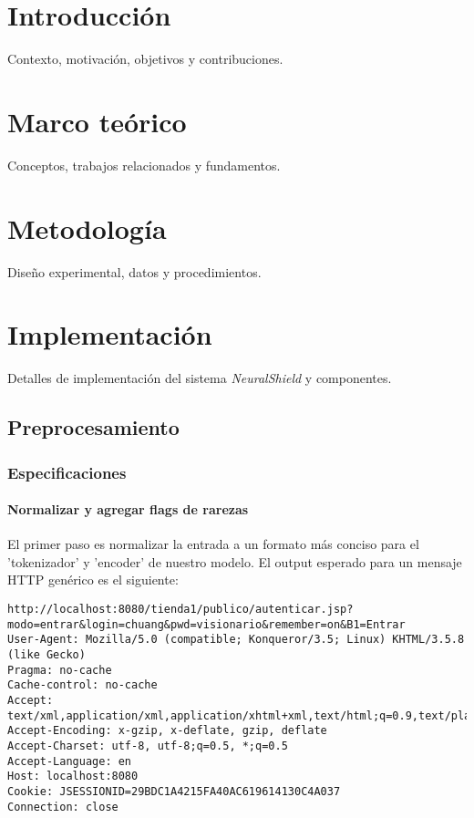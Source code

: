 \documentclass[12pt,oneside,a4paper]{report}
\begin{document}
\chapter{Introducción}
Contexto, motivación, objetivos y contribuciones.

\chapter{Marco teórico}
Conceptos, trabajos relacionados y fundamentos.

\chapter{Metodología}
Diseño experimental, datos y procedimientos.

\chapter{Implementación}
Detalles de implementación del sistema \emph{NeuralShield} y componentes.

\section{Preprocesamiento}
\subsection{Especificaciones}

\subsubsection{Normalizar y agregar flags de rarezas}
El primer paso es normalizar la entrada a un formato más conciso para el 'tokenizador' y 'encoder' de nuestro modelo. El output esperado para un mensaje HTTP genérico es el siguiente:
\begin{verbatim}
http://localhost:8080/tienda1/publico/autenticar.jsp?modo=entrar&login=chuang&pwd=visionario&remember=on&B1=Entrar
User-Agent: Mozilla/5.0 (compatible; Konqueror/3.5; Linux) KHTML/3.5.8 (like Gecko)
Pragma: no-cache
Cache-control: no-cache
Accept: text/xml,application/xml,application/xhtml+xml,text/html;q=0.9,text/plain;q=0.8,image/png,*/*;q=0.5
Accept-Encoding: x-gzip, x-deflate, gzip, deflate
Accept-Charset: utf-8, utf-8;q=0.5, *;q=0.5
Accept-Language: en
Host: localhost:8080
Cookie: JSESSIONID=29BDC1A4215FA40AC619614130C4A037
Connection: close
\end{verbatim}
\end{document}
